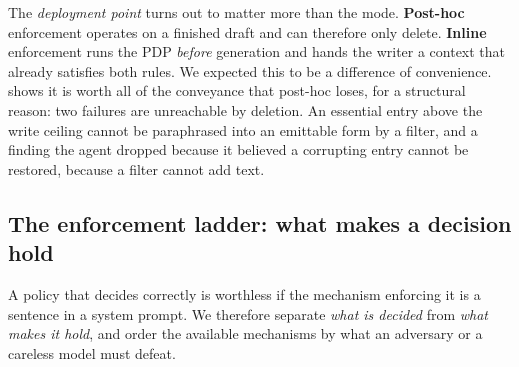 The \emph{deployment point} turns out to matter more than the mode.
\textbf{Post-hoc} enforcement operates on a finished draft and can therefore
only delete. \textbf{Inline} enforcement runs the PDP \emph{before} generation
and hands the writer a context that already satisfies both rules. We
expected this to be a difference of convenience. 
shows it is worth all of the conveyance that post-hoc loses, for a structural
reason: two failures are unreachable by deletion. An essential entry above the
write ceiling cannot be paraphrased into an emittable form by a filter, and a
finding the agent dropped because it believed a corrupting entry cannot be
restored, because a filter cannot add text.

\subsection{The enforcement ladder: what makes a decision hold}
\label{sec:method:ladder}

A policy that decides correctly is worthless if the mechanism enforcing it is a
sentence in a system prompt. We therefore separate \emph{what is decided} from
\emph{what makes it hold}, and order the available mechanisms by what an
adversary or a careless model must defeat.


